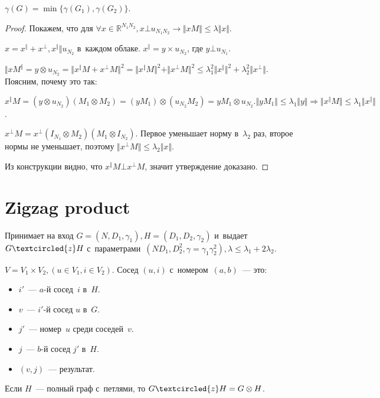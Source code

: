 \documentclass{article}
\begin{document}
\begin{claim}
	$\gamma(G) = \min\{\gamma(G_1), \gamma(G_2)\}$.
\end{claim}
\begin{proof}
	Покажем, что для $\forall x \in \mathbb{R}^{N_1 N_2}, x \bot u_{N_1 N_2}
	\rightarrow \Vert x M \Vert \le \lambda \Vert x \Vert$.

	$x = x^\Vert + x^\bot, x^\Vert \Vert u_{N_2}$ в~каждом облаке. $x^\Vert = y
	\times u_{N_2}$, где $y \bot u_{N_1}$.

	$\Vert xM^\Vert = y \otimes u_{N_2} = \Vert x^\Vert M + x^\bot M \Vert^2 =
	\Vert x^\Vert M\Vert^2 + \Vert x^\bot M\Vert^2 \le \lambda_1^2 \Vert x^\Vert
	\Vert^2 + \lambda_2^2 \Vert x^\bot \Vert$. Поясним, почему это так:

	$x^\Vert M = (y \otimes u_{N_2}) (M_1 \otimes M_2) = (yM_1) \otimes (u_{N_2}
	M_2) = yM_1 \otimes u_{N_2}.
	\Vert yM_1 \Vert \le \lambda_1 \Vert y \Vert
	\Rightarrow \Vert x^\Vert M \Vert \le \lambda_1 \Vert x^\Vert \Vert$.

	$x^\bot M = x^\bot (I_{N_1} \otimes M_2) (M_1 \otimes I_{N_2})$. Первое
	уменьшает норму в~$\lambda_2$ раз, второе нормы не уменьшает, поэтому $\Vert
	x^\bot M \Vert \le \lambda_2 \Vert x \Vert$.

	Из конструкции видно, что $x^\Vert M \bot x^\bot M$, значит утверждение
	доказано.
\end{proof}

\section{Zigzag product}

Принимает на вход $G = (N, D_1, \gamma_1), H = (D_1, D_2, \gamma_2)$ и~выдает $G
\textcircled{z} H$ с~параметрами~$(N D_1, D_2^2, \gamma = \gamma_1 \gamma_2^2),
\lambda \le \lambda_1 + 2 \lambda_2$.

$V = V_1 \times V_2, (u \in V_1, i \in V_2)$. Сосед $(u, i)$ с~номером~$(a,
b)$~--- это:
\begin{itemize}
	\item $i'$~--- $a$-й сосед~$i$ в~$H$.
	\item $v$~--- $i'$-й сосед $u$ в~$G$.
	\item $j'$~--- номер~$u$ среди соседей~$v$.
	\item $j$~--- $b$-й сосед $j'$ в~$H$.
	\item $(v, j)$~--- результат.
\end{itemize}

Если $H$~--- полный граф с~петлями, то $G \textcircled{z} H = G \otimes H$.
\end{document}
